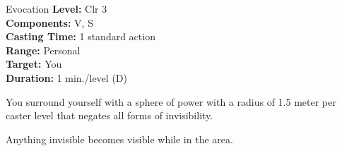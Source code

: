 {Evocation}
{
	\textbf{Level:}
	Clr 3\\
	\textbf{Components:}
	V, S\\
	\textbf{Casting Time:}
	1 standard action\\
	\textbf{Range:}
	Personal\\
	\textbf{Target:}
	You\\
	\textbf{Duration:}
	1 min./level (D)\\
}
{
	You surround yourself with a sphere of power with a radius of 1.5 meter per caster level that negates all forms of invisibility.

	Anything invisible becomes visible while in the area.

}
